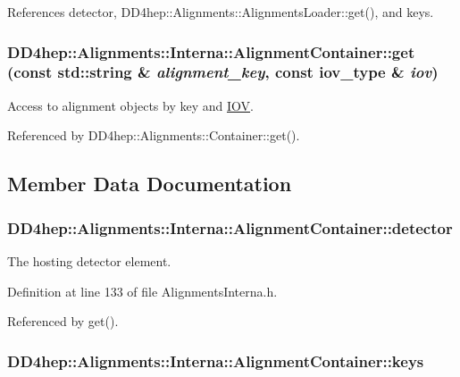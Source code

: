 References detector, DD4hep::Alignments::AlignmentsLoader::get(), and keys.\hypertarget{class_d_d4hep_1_1_alignments_1_1_interna_1_1_alignment_container_a4abe330b3f28a9ee56f512844312f477}{
\subsubsection[{get}]{ DD4hep::Alignments::Interna::AlignmentContainer::get (const std::string \& {\em alignment\_\-key}, \/  const {\bf iov\_\-type} \& {\em iov})}}
\label{class_d_d4hep_1_1_alignments_1_1_interna_1_1_alignment_container_a4abe330b3f28a9ee56f512844312f477}


Access to alignment objects by key and \hyperlink{class_d_d4hep_1_1_i_o_v}{IOV}. 

Referenced by DD4hep::Alignments::Container::get().

\subsection{Member Data Documentation}
\hypertarget{class_d_d4hep_1_1_alignments_1_1_interna_1_1_alignment_container_a21939f73d4dae58da536ec3f3480e7d3}{
\subsubsection[{detector}]{ {\bf DD4hep::Alignments::Interna::AlignmentContainer::detector}}}
\label{class_d_d4hep_1_1_alignments_1_1_interna_1_1_alignment_container_a21939f73d4dae58da536ec3f3480e7d3}


The hosting detector element. 

Definition at line 133 of file AlignmentsInterna.h.

Referenced by get().\hypertarget{class_d_d4hep_1_1_alignments_1_1_interna_1_1_alignment_container_adb4a3abb58c149338ecc2d08e2c0aec9}{
\subsubsection[{keys}]{ {\bf DD4hep::Alignments::Interna::AlignmentContainer::keys}}}
\label{class_d_d4hep_1_1_alignments_1_1_interna_1_1_alignment_container_adb4a3abb58c149338ecc2d08e2c0aec9}


